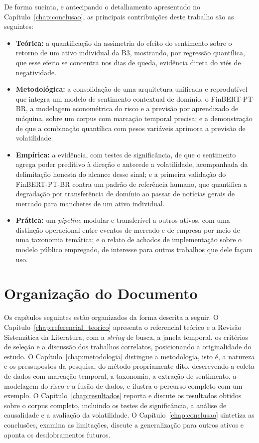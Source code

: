 De forma sucinta, e antecipando o detalhamento apresentado no Capítulo~\ref{chap:conclusao}, as principais contribuições deste trabalho são as seguintes:

\begin{itemize}
    \item \textbf{Teórica:} a quantificação da assimetria do efeito do sentimento sobre o retorno de um ativo individual da B3, mostrando, por regressão quantílica, que esse efeito se concentra nos dias de queda, evidência direta do viés de negatividade.
    \item \textbf{Metodológica:} a consolidação de uma arquitetura unificada e reprodutível que integra um modelo de sentimento contextual de domínio, o FinBERT-PT-BR, a modelagem econométrica do risco e a previsão por aprendizado de máquina, sobre um corpus com marcação temporal precisa; e a demonstração de que a combinação quantílica com pesos variáveis aprimora a previsão de volatilidade.
    \item \textbf{Empírica:} a evidência, com testes de significância, de que o sentimento agrega poder preditivo à direção e antecede a volatilidade, acompanhada da delimitação honesta do alcance desse sinal; e a primeira validação do FinBERT-PT-BR contra um padrão de referência humano, que quantifica a degradação por transferência de domínio ao passar de notícias gerais de mercado para manchetes de um ativo individual.
    \item \textbf{Prática:} um \textit{pipeline} modular e transferível a outros ativos, com uma distinção operacional entre eventos de mercado e de empresa por meio de uma taxonomia temática; e o relato de achados de implementação sobre o modelo público empregado, de interesse para outros trabalhos que dele façam uso.
\end{itemize}

\section{Organização do Documento}

Os capítulos seguintes estão organizados da forma descrita a seguir. O Capítulo~\ref{chap:referencial_teorico} apresenta o referencial teórico e a Revisão Sistemática da Literatura, com a \textit{string} de busca, a janela temporal, os critérios de seleção e a discussão dos trabalhos correlatos, posicionando a originalidade do estudo. O Capítulo~\ref{chap:metodologia} distingue a metodologia, isto é, a natureza e os pressupostos da pesquisa, do método propriamente dito, descrevendo a coleta de dados com marcação temporal, a taxonomia, a extração de sentimento, a modelagem do risco e a fusão de dados, e ilustra o percurso completo com um exemplo. O Capítulo~\ref{chap:resultados} reporta e discute os resultados obtidos sobre o corpus completo, incluindo os testes de significância, a análise de causalidade e a avaliação da volatilidade. O Capítulo~\ref{chap:conclusao} sintetiza as conclusões, examina as limitações, discute a generalização para outros ativos e aponta os desdobramentos futuros.
